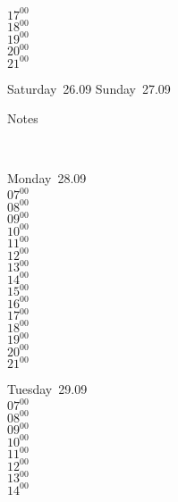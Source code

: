 \documentclass[11pt,a4paper]{book}\usepackage[]{graphicx}\usepackage[]{color}
\begin{document}
{{{{{{{{{{{{\begin{tcolorbox}
{$17^{00}$\\
$18^{00}$\\
$19^{00}$\\
$20^{00}$\\
$21^{00}$}\\
\end{tcolorbox} 
%
\begin{tcolorbox}[height=(\textheight-10mm)/6]
Saturday~26.09
\tcblower
Sunday~27.09
\end{tcolorbox} %
%
\begin{tcolorbox}[height=(\textheight-10mm)/6,sidebyside=false]
Notes
\end{tcolorbox}
\clearpage
\vspace{2 mm}\\
%
%
\begin{tcolorbox}
Monday~28.09\\
{ 
$07^{00}$\\
$08^{00}$\\
$09^{00}$\\
$10^{00}$\\
$11^{00}$\\
$12^{00}$\\
$13^{00}$\\
$14^{00}$\\
$15^{00}$\\
$16^{00}$\\
$17^{00}$\\
$18^{00}$\\
$19^{00}$\\
$20^{00}$\\
$21^{00}$}\\
\end{tcolorbox}
%
\begin{tcolorbox}
Tuesday~29.09\\
{ 
$07^{00}$\\
$08^{00}$\\
$09^{00}$\\
$10^{00}$\\
$11^{00}$\\
$12^{00}$\\
$13^{00}$\\
$14^{00}$\\
}
\end{tcolorbox}}}}}}}}}}}}}
\end{document}
